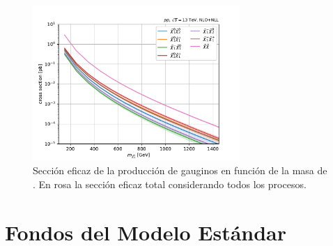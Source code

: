 \begin{figure}
  \centering
  \includegraphics[width=0.7\textwidth]{images/SUSY_EWK_xsecs_m.pdf}
  \caption{Sección eficaz de la producción de gauginos en función de la masa de \ninoone. En rosa la sección eficaz total considerando todos los procesos.}
  \label{fig:SUSY_EWK_xs}
\end{figure}



\section{Fondos del Modelo Estándar}

